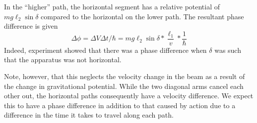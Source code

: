 In the ``higher'' path, the horizontal segment has a relative potential of \(mg\ell_2\sin\delta\) compared to the horizontal on the lower path. The resultant phase difference is given
\[\Delta \phi = \Delta V \Delta t /\hbar= mg\ell_2\sin\delta * \frac{\ell_1}{v} * \frac{1}{\hbar}\]
Indeed, experiment showed that there was a phase difference when \(\delta\) was such that the apparatus was not horizontal. 

Note, however, that this neglects the velocity change in the beam as a result of the change in gravitational potential. While the two diagonal arms cancel each other out, the horizontal paths consequently have a velocity difference. We expect this to have a phase difference in addition to that caused by action due to a difference in the time it takes to travel along each path. 
